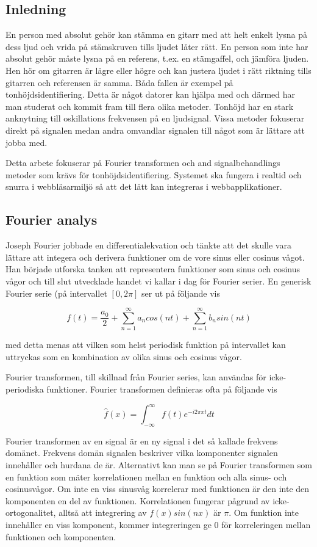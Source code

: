 \subsection*{Inledning}
En person med absolut gehör kan stämma en gitarr med att helt enkelt lysna på dess ljud och vrida på stämskruven tills ljudet låter rätt. En person som inte har absolut gehör måste lysna på en referens, t.ex. en stämgaffel, och jämföra ljuden. Hen hör om gitarren är lägre eller högre och kan justera ljudet i rätt riktning tills gitarren och referensen är samma. Båda fallen är exempel på tonhöjdsidentifiering. Detta är något datorer kan hjälpa med och därmed har man studerat och kommit fram till flera olika metoder. Tonhöjd har en stark anknytning till oskillations frekvensen på en ljudsignal. Vissa metoder fokuserar direkt på signalen medan andra omvandlar signalen till något som är lättare att jobba med.

Detta arbete fokuserar på Fourier transformen och and signalbehandlings metoder som krävs för tonhöjdsidentifiering. Systemet ska fungera i realtid och snurra i webbläsarmiljö så att det lätt kan integreras i webbapplikationer.

\subsection*{Fourier analys}
Joseph Fourier jobbade en differentialekvation och tänkte att det skulle vara lättare att integera och derivera funktioner om de vore sinus eller cosinus vågot. Han började utforska tanken att representera funktioner som sinus och cosinus vågor och till slut utvecklade handet vi kallar i dag för Fourier serier. En generisk Fourier serie (på intervallet $[0, 2\pi]$ ser ut på följande vis

$$f(t) = \frac{a_0}{2} + \sum_{n=1}^{\infty}a_ncos(nt)+\sum_{n=1}^{\infty}b_nsin(nt)$$

med detta menas att vilken som helst periodisk funktion på intervallet kan uttryckas som en
kombination av olika sinus och cosinus vågor. 

Fourier transformen, till skillnad från Fourier series, kan användas för icke-periodiska funktioner. Fourier transformen definieras ofta på följande vis

$$\hat{f}(x) = \int_{-\infty}^{\infty} f(t)e^{-i2\pi x t} dt$$

Fourier transformen av en signal är en ny signal i det så kallade frekvens domänet. Frekvens domän signalen beskriver vilka komponenter signalen innehåller och hurdana de är. Alternativt kan man se på Fourier transformen som en funktion som mäter korrelationen mellan en funktion och alla sinus- och cosinusvågor. Om inte en viss sinusvåg korrelerar med funktionen
är den inte den komponenten en del av funktionen. Korrelationen fungerar pågrund av icke-ortogonalitet, alltså att integrering av $f(x)sin(nx)$ är $\pi$. Om funktion inte innehåller en viss komponent, kommer integreringen ge $0$ för korreleringen mellan funktionen och komponenten.

